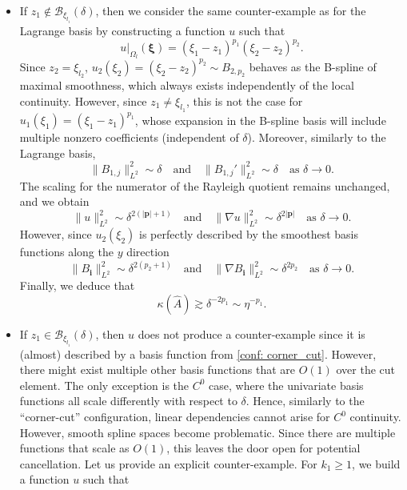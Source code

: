 \documentclass{article}
\numberwithin{equation}{section}
\newcommand{\restr}[2]{\left.{#1}\right|_{#2}}
\theoremstyle{definition}
\begin{document}
\begin{itemize}
    \item If $z_1 \notin \mathcal{B}_{\xi_{l_i}}(\delta)$, then we consider the same counter-example as for the Lagrange basis by constructing a function $u$ such that
\begin{equation*}
    \restr{u}{\Omega_l}(\bm{\xi}) = (\xi_1-z_1)^{p_1}(\xi_2-z_2)^{p_2}.
\end{equation*}
Since $z_2=\xi_{l_2}$, $u_2(\xi_2)=(\xi_2-z_2)^{p_2} \sim B_{2,p_2}$ behaves as the B-spline of maximal smoothness, which always exists independently of the local continuity. However, since $z_1 \neq \xi_{l_1}$, this is not the case for $u_1(\xi_1)=(\xi_1-z_1)^{p_1}$, whose expansion in the B-spline basis will include multiple nonzero coefficients (independent of $\delta$). Moreover, similarly to the Lagrange basis,
\begin{equation*}
    \|B_{1,j}\|_{L^2}^2 \sim \delta \quad \text{and} \quad \|B_{1,j}'\|_{L^2}^2 \sim \delta \quad \text{as } \delta \to 0.
\end{equation*}
The scaling for the numerator of the Rayleigh quotient remains unchanged, and we obtain
\begin{equation*}
    \|u\|_{L^2}^2 \sim \delta^{2(|\bm{p}|+1)} \quad \text{and} \quad \|\nabla u\|_{L^2}^2 \sim \delta^{2|\bm{p}|} \quad \text{as } \delta \to 0.
\end{equation*}
However, since $u_2(\xi_2)$ is perfectly described by the smoothest basis functions along the $y$ direction
\begin{equation*}
    \|B_{\bm{i}}\|_{L^2}^2 \sim \delta^{2(p_2+1)} \quad \text{and} \quad \|\nabla B_{\bm{i}}\|_{L^2}^2 \sim \delta^{2p_2} \quad \text{as } \delta \to 0.
\end{equation*}
Finally, we deduce that
\begin{equation*}
    \kappa(\hat{A}) \gtrsim \delta^{-2p_1} \sim \eta^{-p_1}.
\end{equation*}
\item If $z_1 \in \mathcal{B}_{\xi_{l_i}}(\delta)$, then $u$ does not produce a counter-example since it is (almost) described by a basis function from \ref{conf: corner_cut}. However, there might exist multiple other basis functions that are $O(1)$ over the cut element. The only exception is the $C^0$ case, where the univariate basis functions all scale differently with respect to $\delta$. Hence, similarly to the ``corner-cut'' configuration, linear dependencies cannot arise for $C^0$ continuity. However, smooth spline spaces become problematic. Since there are multiple functions that scale as $O(1)$, this leaves the door open for potential cancellation. Let us provide an explicit counter-example. For $k_1 \geq 1$, we build a function $u$ such that

\end{itemize}
\end{document}
